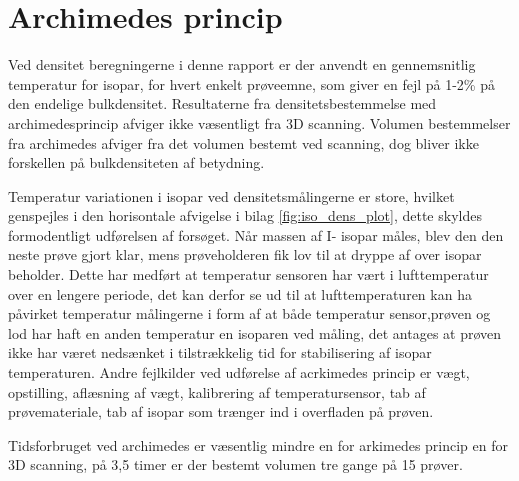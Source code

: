 \section{Archimedes princip}
Ved densitet beregningerne i denne rapport er der anvendt en gennemsnitlig temperatur for isopar, for hvert enkelt prøveemne, som giver en fejl på 1-2\% på den endelige bulkdensitet.
Resultaterne fra densitetsbestemmelse med archimedesprincip afviger ikke væsentligt fra 3D scanning. Volumen bestemmelser fra archimedes afviger fra det volumen bestemt ved scanning, dog bliver ikke forskellen på bulkdensiteten af betydning. 

Temperatur variationen i isopar ved densitetsmålingerne er store, hvilket genspejles i den horisontale afvigelse i bilag \vref{fig:iso_dens_plot}, dette skyldes formodentligt udførelsen af forsøget. Når massen af I- isopar måles, blev den den neste prøve gjort klar, mens prøveholderen fik lov til at dryppe af over isopar beholder. Dette har medført at temperatur sensoren har vært i lufttemperatur over en lengere periode, det kan derfor se ud til at lufttemperaturen kan ha påvirket temperatur målingerne i form af at både temperatur sensor,prøven og lod har haft en anden temperatur en isoparen ved måling, det antages at prøven ikke har været nedsænket i tilstrækkelig tid for stabilisering af isopar temperaturen.     
Andre fejlkilder ved udførelse af acrkimedes princip er vægt, opstilling, aflæsning af vægt, kalibrering af temperatursensor, tab af prøvemateriale, tab af isopar som trænger ind i overfladen på prøven. 

Tidsforbruget ved archimedes er væsentlig mindre en for arkimedes princip en for 3D scanning, på 3,5 timer er der bestemt volumen tre gange på 15 prøver.
